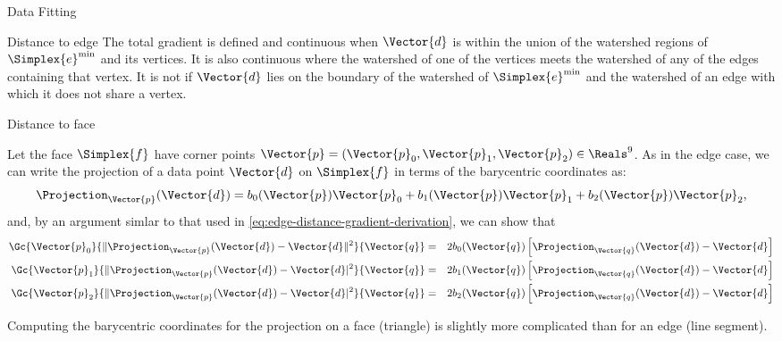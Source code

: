 \begin{plSection}{Data Fitting}
\begin{plSection}{Distance to edge}
The total gradient is defined and continuous
when $\Vector{d}$ is within the union of the watershed regions
of $\Simplex{e}^{\min}$ and its vertices.
It is also continuous where the watershed of one of the vertices
meets the watershed of any of the edges containing that vertex.
It is not if $\Vector{d}$ lies on the boundary of the
watershed of $\Simplex{e}^{\min}$ and the watershed of an
edge with which it does not share a vertex.

\end{plSection}%
\begin{plSection}{Distance to face}
\label{sec:Distance-to-face}

Let the face $\Simplex{f}$ have corner points $\Vector{p} = (\Vector{p}_0, \Vector{p}_1, \Vector{p}_2) \in \Reals^9$.
As in the edge case,
we can write the projection of a data point $\Vector{d}$ on $\Simplex{f}$
in terms of the barycentric coordinates as:
\begin{equation}
\Projection_\Vector{p} (\Vector{d}) = b_0(\Vector{p}) \Vector{p}_0 + b_1(\Vector{p}) \Vector{p}_1 + b_2(\Vector{p}) \Vector{p}_2,
\end{equation}
and, by an argument simlar to that used in
\cref{eq:edge-distance-gradient-derivation},
we can show that
\begin{eqnarray}
\label{eq:face-distance-gradient}
\Gc{\Vector{p}_0}{ \| \Projection_{\Vector{p}} (\Vector{d}) - \Vector{d} \|^2 }{\Vector{q}}
& = & 2 b_0(\Vector{q}) \left[ \Projection_{\Vector{q}} (\Vector{d}) - \Vector{d} \right]
\\
\Gc{\Vector{p}_1}{ \| \Projection_{\Vector{p}} (\Vector{d}) - \Vector{d}|^2 }{\Vector{q}}
& = & 2 b_1(\Vector{q}) \left[ \Projection_\Vector{q} (\Vector{d}) - \Vector{d} \right]
\nonumber
\\
\Gc{\Vector{p}_2}{ \| \Projection_{\Vector{p}} (\Vector{d}) - \Vector{d}|^2 }{\Vector{q}}
& = & 2 b_2(\Vector{q}) \left[ \Projection_\Vector{q} (\Vector{d}) - \Vector{d} \right]
\nonumber
\end{eqnarray}

Computing the barycentric coordinates for the projection
on a face (triangle) is slightly more complicated than
for an edge (line segment).


\end{plSection}
\end{plSection}
